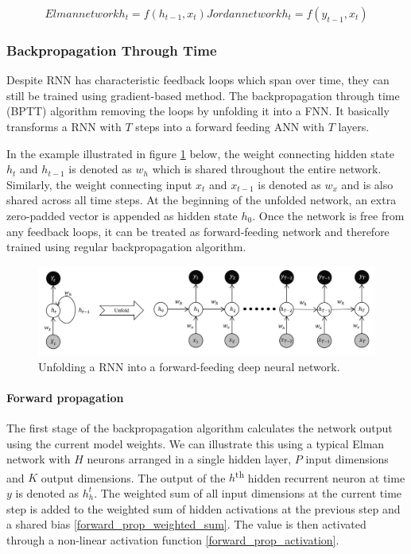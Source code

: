 \documentclass[11pt]{article} %
\theoremstyle{plain}
\theoremstyle{definition}
\begin{document}
\begin{subequations}
Elman network
\begin{equation}
\label{elman_update}
h_t = f(h_{t-1}, x_t)
\end{equation}

Jordan network
\begin{equation}
\label{jordan_update}
h_t = f(y_{t-1}, x_t)
\end{equation}
\end{subequations}

\subsubsection{Backpropagation Through Time}

Despite RNN has characteristic feedback loops which span over time, they can still be trained using gradient-based method. The backpropagation through time (BPTT) algorithm removing the loops by unfolding it into a FNN. It basically transforms a RNN with \(T\) steps into a forward feeding ANN with \(T\) layers.

In the example illustrated in figure \ref{fig:rnn} below, the weight connecting hidden state \(h_t\) and \(h_{t-1}\) is denoted as \(w_h\) which is shared throughout the entire network. Similarly, the weight connecting input \(x_t\) and \(x_{t-1}\) is denoted as \(w_x\) and is also shared across all time steps. At the beginning of the unfolded network, an extra zero-padded vector is appended as hidden state \(h_0\). Once the network is free from any feedback loops, it can be treated as forward-feeding network and therefore trained using regular backpropagation algorithm.

\begin{figure}[H]
	\centering
	\includegraphics[width=1\textwidth]{rnn.PNG}
	\caption{Unfolding a RNN into a forward-feeding deep neural network.}
	\label{fig:rnn}
\end{figure}

\paragraph{Forward propagation} The first stage of the backpropagation algorithm calculates the network output using the current model weights. We can illustrate this using a typical Elman network with \(H\) neurons arranged in a single hidden layer, \(P\) input dimensions and \(K\) output dimensions. The output of the \(h\)\textsuperscript{th} hidden recurrent neuron at time \(y\) is denoted as \(h^t_h\). The weighted sum of all input dimensions at the current time step is added to the weighted sum of hidden activations at the previous step and a shared bias \eqref{forward_prop_weighted_sum}. The value is then activated through a non-linear activation function \eqref{forward_prop_activation}.
\end{document}
